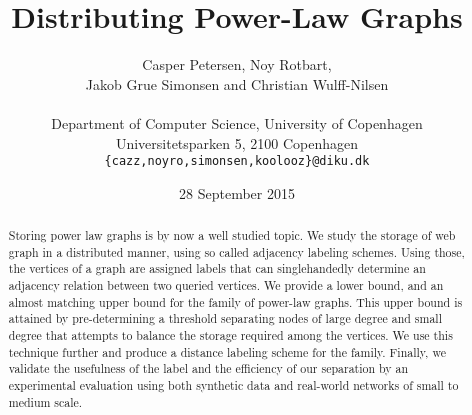 \documentclass{acm_proc_article-sp}
\begin{document}
\title{Distributing Power-Law Graphs}
%
%
%
%
%

%

\author{Casper Petersen, Noy Rotbart,\\ Jakob Grue Simonsen and Christian Wulff-Nilsen \\ \\
\small{Department of Computer Science, University of Copenhagen} \\
\small{Universitetsparken 5, 2100 Copenhagen}\\
 \small{\texttt{\{cazz,noyro,simonsen,koolooz\}@diku.dk}}  }
 

\date{28 September 2015}
\maketitle
\begin{abstract}
Storing  power law graphs is by now a well studied topic.
We study the storage of  web graph  in a distributed manner,  using so called adjacency labeling schemes. 
Using those, the vertices of a graph are assigned labels that can singlehandedly determine an adjacency relation between two queried vertices.
We  provide a lower bound, and  an almost matching  upper bound for the family of power-law graphs.
This upper bound is attained by pre-determining a threshold separating nodes of large degree and small degree that attempts to balance the storage required among the vertices. 
We use this technique further and produce a distance labeling scheme for the family.
Finally, we validate the usefulness of the label and the efficiency of our separation by  an experimental evaluation  using both synthetic data and real-world networks of small to medium scale. 
\end{abstract}
\end{document}
